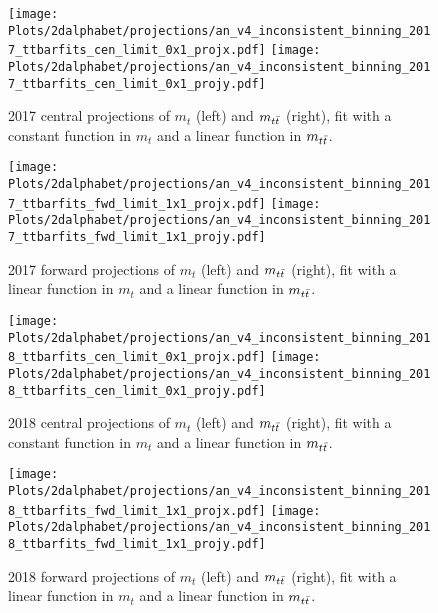 \begin{figure}[htp]
	\begin{center}
		
		\texttt{[image: Plots/2dalphabet/projections/an\_v4\_inconsistent\_binning\_2017\_ttbarfits\_cen\_limit\_0x1\_projx.pdf]}
		\texttt{[image: Plots/2dalphabet/projections/an\_v4\_inconsistent\_binning\_2017\_ttbarfits\_cen\_limit\_0x1\_projy.pdf]}
		\caption{2017 central projections of $m_t$ (left) and $m_{t\bar{t}}$ (right), fit with a constant function in $m_t$ and a linear function in $m_{t\bar{t}}$.}
		\label{fig:2017cen_proj}
	\end{center}
\end{figure}





\begin{figure}[htp]
	\begin{center}
		
		\texttt{[image: Plots/2dalphabet/projections/an\_v4\_inconsistent\_binning\_2017\_ttbarfits\_fwd\_limit\_1x1\_projx.pdf]}
		\texttt{[image: Plots/2dalphabet/projections/an\_v4\_inconsistent\_binning\_2017\_ttbarfits\_fwd\_limit\_1x1\_projy.pdf]}
		\caption{2017 forward projections of $m_t$ (left) and $m_{t\bar{t}}$ (right), fit with a linear function in $m_t$ and a linear function in $m_{t\bar{t}}$.}
		\label{fig:2017fwd_proj}
	\end{center}
\end{figure}




\begin{figure}[htp]
	\begin{center}
		
		\texttt{[image: Plots/2dalphabet/projections/an\_v4\_inconsistent\_binning\_2018\_ttbarfits\_cen\_limit\_0x1\_projx.pdf]}
		\texttt{[image: Plots/2dalphabet/projections/an\_v4\_inconsistent\_binning\_2018\_ttbarfits\_cen\_limit\_0x1\_projy.pdf]}
		\caption{2018 central projections of $m_t$ (left) and $m_{t\bar{t}}$ (right), fit with a constant function in $m_t$ and a linear function in $m_{t\bar{t}}$.}
		\label{fig:2018cen_proj}
	\end{center}
\end{figure}



\begin{figure}[htp]
	\begin{center}
		
		\texttt{[image: Plots/2dalphabet/projections/an\_v4\_inconsistent\_binning\_2018\_ttbarfits\_fwd\_limit\_1x1\_projx.pdf]}
		\texttt{[image: Plots/2dalphabet/projections/an\_v4\_inconsistent\_binning\_2018\_ttbarfits\_fwd\_limit\_1x1\_projy.pdf]}
		\caption{2018 forward projections of $m_t$ (left) and $m_{t\bar{t}}$ (right), fit with a linear function in $m_t$ and a linear function in $m_{t\bar{t}}$.}
		\label{fig:2018fwd_proj}
	\end{center}
\end{figure}